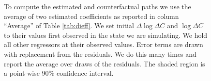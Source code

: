 \documentclass[11pt,reqno,letter]{amsart}
\theoremstyle{definition}
\begin{document}
\begin{figure}[b]
\begin{minipage}{\linewidth}
\begin{tabular}{ccc}
    \end{tabular}
    \begin{flushleft}
      \footnotesize To compute the estimated and counterfactual paths
      we use the average of two estimated coefficients as reported in
      column ``Average'' of Table \ref{tab:dieff}. We set initial
      $\Delta \log \Delta C$ and $\log \Delta C$ to their values first
      observed in the state we are simulating. We hold all other
      regressors at their observed values. Error terms are drawn with
      replacement from the residuals. We do this many times and report
      the average over draws of the residuals. The shaded region is a
      point-wise 90\% confidence interval.
    \end{flushleft}
  \end{minipage}
\end{figure}
\end{document}
